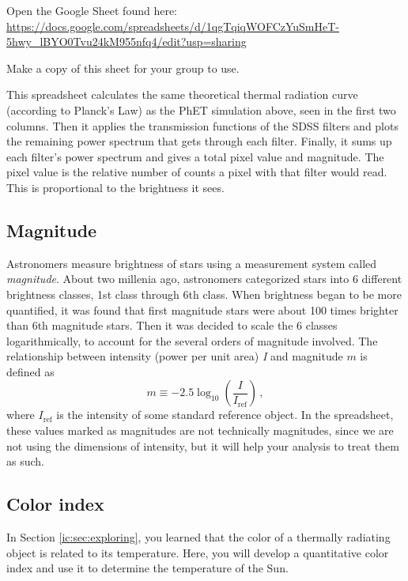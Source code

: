 \begin{steps}
	\item Open the Google Sheet found here: \url{https://docs.google.com/spreadsheets/d/1qgTqiqWOFCzYuSmHeT-5hwy_lBYO0Tvu24kM955nfq4/edit?usp=sharing}
	
	\item Make a copy of this sheet for your group to use.
\end{steps}

This spreadsheet calculates the same theoretical thermal radiation curve (according to Planck's Law) as the PhET simulation above, seen in the first two columns. Then it applies the transmission functions of the SDSS filters and plots the remaining power spectrum that gets through each filter. Finally, it sums up each filter's power spectrum and gives a total pixel value and magnitude. The pixel value is the relative number of counts a pixel with that filter would read. This is proportional to the brightness it sees.

\subsection{Magnitude}

Astronomers measure brightness of stars using a measurement system called \textit{magnitude}. About two millenia ago, astronomers categorized stars into 6 different brightness classes, 1st class through 6th class. When brightness began to be more quantified, it was found that first magnitude stars were about 100 times brighter than 6th magnitude stars. Then it was decided to scale the 6 classes logarithmically, to account for the several orders of magnitude involved. The relationship between intensity (power per unit area) \textit{I} and magnitude $m$ is defined as
\begin{equation}
 m \equiv -2.5 \log_{10} \left(\frac{I}{I_\textrm{ref}}\right) \,,
\end{equation}
where $I_\textrm{ref}$ is the intensity of some standard reference object. In the spreadsheet, these values marked as magnitudes are not technically magnitudes, since we are not using the dimensions of intensity, but it will help your analysis to treat them as such.

\subsection{Color index}

In Section \ref{ic:sec:exploring}, you learned that the color of a thermally radiating object is related to its temperature. Here, you will develop a quantitative color index and use it to determine the temperature of the Sun.

